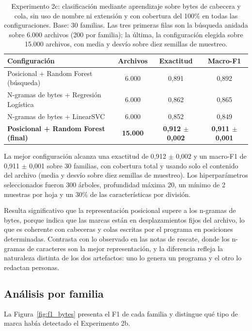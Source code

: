 \begin{table}[ht]
\centering
\caption{Experimento 2c: clasificación mediante aprendizaje sobre bytes de cabecera y cola, sin uso de nombre ni extensión y con cobertura del 100\% en todas las configuraciones. Base: 30 familias. Las tres primeras filas son la búsqueda anidada sobre 6.000 archivos (200 por familia); la última, la configuración elegida sobre 15.000 archivos, con media y desvío sobre diez semillas de muestreo.}
\label{tab:exp2c}
\begin{tabular}{|l|c|c|c|}
\hline
\textbf{Configuración} & \textbf{Archivos} & \textbf{Exactitud} & \textbf{Macro-F1} \\
\hline
Posicional + Random Forest (búsqueda) & 6.000 & 0,891 & 0,892 \\
N-gramas de bytes + Regresión Logística & 6.000 & 0,862 & 0,865 \\
N-gramas de bytes + LinearSVC & 6.000 & 0,852 & 0,849 \\
\hline
\textbf{Posicional + Random Forest (final)} & \textbf{15.000} & \textbf{0,912 $\pm$ 0,002} & \textbf{0,911 $\pm$ 0,001} \\
\hline
\end{tabular}
\end{table}

La mejor configuración alcanza una exactitud de 0,912 $\pm$ 0,002 y un macro-F1 de 0,911 $\pm$ 0,001 sobre 30 familias, con cobertura total y usando solo el contenido del archivo (media y desvío sobre diez semillas de muestreo). Los hiperparámetros seleccionados fueron 300 árboles, profundidad máxima 20, un mínimo de 2 muestras por hoja y un 30\% de las características por división.

Resulta significativo que la representación posicional supere a los n-gramas de bytes, porque indica que las marcas están en desplazamientos fijos del archivo, lo que es coherente con cabeceras y colas escritas por el programa en posiciones determinadas. Contrasta con lo observado en las notas de rescate, donde los n-gramas de caracteres son la mejor representación, y la diferencia refleja la naturaleza distinta de los dos artefactos: uno lo genera un programa y el otro lo redactan personas.

\subsection{Análisis por familia}

La Figura~\ref{fig:f1_bytes} presenta el F1 de cada familia y distingue qué tipo de marca había detectado el Experimento 2b.

